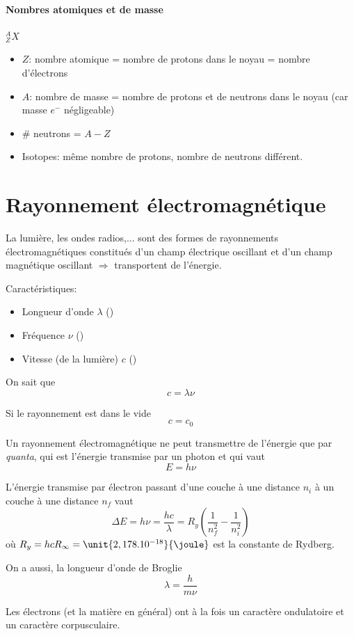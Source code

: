\documentclass[11pt,a4paper,french]{article}
\begin{document}
\paragraph{Nombres atomiques et de masse}

\emph{$^{A}_{Z}X$}
\begin{itemize}
	\item $Z$: nombre atomique = nombre de protons dans le noyau = nombre d'électrons
	\item $A$: nombre de masse = nombre de protons et de neutrons dans le noyau (car masse $e^{-}$ négligeable)
	\item \# neutrons = $A-Z$
	\item Isotopes: même nombre de protons, nombre de neutrons différent.
\end{itemize}

\section{Rayonnement électromagnétique}

La lumière, les ondes radios,... sont des formes de rayonnements électromagnétiques constitués d'un champ électrique oscillant et d'un champ magnétique oscillant $\Rightarrow$ transportent de l'énergie.

Caractéristiques:
\begin{itemize}
	\item Longueur d'onde $\lambda$ (\meter)
	\item Fréquence $\nu$ (\hertz)
	\item Vitesse (de la lumière) $c$ (\meter\per\second)
\end{itemize}

On sait que
\[ c = \lambda \nu \]

Si le rayonnement est dans le vide
\[ c = c_0 \]

Un rayonnement électromagnétique ne peut transmettre de l'énergie que par {\it quanta}, qui est l'énergie transmise par un photon et qui vaut
\[ E = h\nu \]

L'énergie transmise par électron passant d'une couche à une distance $n_i$ à un couche à une distance $n_f$ vaut
\[ \Delta E = h\nu = \frac{hc}{\lambda} = R_y \left( \frac{1}{n_f^2} - \frac{1}{n_i^2} \right) \]
où $R_y = hc R_\infty = \unit{2,178 . 10^{-18}}{\joule}$ est la constante de Rydberg.

On a aussi, la longueur d'onde de Broglie
\[ \lambda = \frac{h}{m\nu} \]

Les électrons (et la matière en général) ont à la fois un caractère ondulatoire et un caractère corpusculaire.
\end{document}
